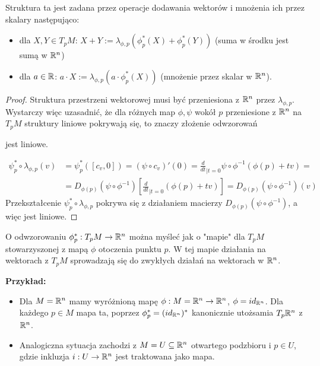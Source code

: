 Struktura ta jest zadana przez operacje dodawania wektorów i mnożenia ich przez skalary następująco:
\begin{itemize}
  \item dla $X, Y\in T_pM$: $X+Y:=\lambda_{\phi, p}(\phi^*_p(X)+\phi^*_p(Y))$ (suma w środku jest sumą w $\mathbb{R}^n$)
  \item dla $a\in\mathbb{R}$: $a\cdot X:=\lambda_{\phi, p}(a\cdot \phi_p^*(X))$ (mnożenie przez skalar w $\mathbb{R}^n$).
\end{itemize}

\begin{proof} Struktura przestrzeni wektorowej musi być przeniesiona z $\mathbb{R}^n$ przez $\lambda_{\phi, p}$. Wystarczy więc uzasadnić, że dla różnych map $\phi,\psi$ wokół $p$ przeniesione z $\mathbb{R}^n$ na $T_pM$ struktury liniowe pokrywają się, to znaczy złożenie odwzorowań

\begin{center}\end{center} 

jest liniowe.

\begin{align*}
  \psi_p^*\circ\lambda_{\phi,p}(v)&=\psi_p^*([c_v,0])=(\psi\circ c_v)'(0)=\frac{d}{dt}_{{\scriptstyle|t=0}}\psi\circ\phi^{-1}(\phi(p)+tv)=\\
                                  &=D_{\phi(p)}(\psi\circ\phi^{-1})[\frac{d}{dt}_{{\scriptstyle|t=0}}(\phi(p)+tv)]=D_{\phi(p)}(\psi\circ\phi^{-1})(v)
\end{align*}
Przekształcenie $\psi_p^*\circ\lambda_{\phi, p}$ pokrywa się z działaniem macierzy $D_{\phi(p)}(\psi\circ\phi^{-1})$, a więc jest liniowe.

\end{proof}

O odwzorowaniu $\phi_p^*:T_pM\to\mathbb{R}^n$ można myśleć jak o "mapie" dla $T_pM$ stowarzyszonej z mapą $\phi$ otoczenia punktu $p$. W tej mapie działania na wektorach z $T_pM$ sprowadzają się do zwykłych działań na wektorach w $\mathbb{R}^n$.

\textbf{Przykład:}
\begin{itemize}
  \item Dla $M=\mathbb{R}^n$ mamy wyróżnioną mapę $\phi:M=\mathbb{R}^n\to \mathbb{R}^n$, $\phi=id_{\mathbb{R}^n}$. Dla każdego $p\in M$ mapa ta, poprzez $\phi_p^*=(id_{\mathbb{R}^n})^*$ kanonicznie utożsamia $T_p\mathbb{R}^n$ z $\mathbb{R}^n$.
  \item Analogiczna sytuacja zachodzi z $M=U\subseteq\mathbb{R}^n$ otwartego podzbioru i $p\in U$, gdzie inkluzja $i:U\to\mathbb{R}^n$ jest traktowana jako mapa.
\end{itemize}

